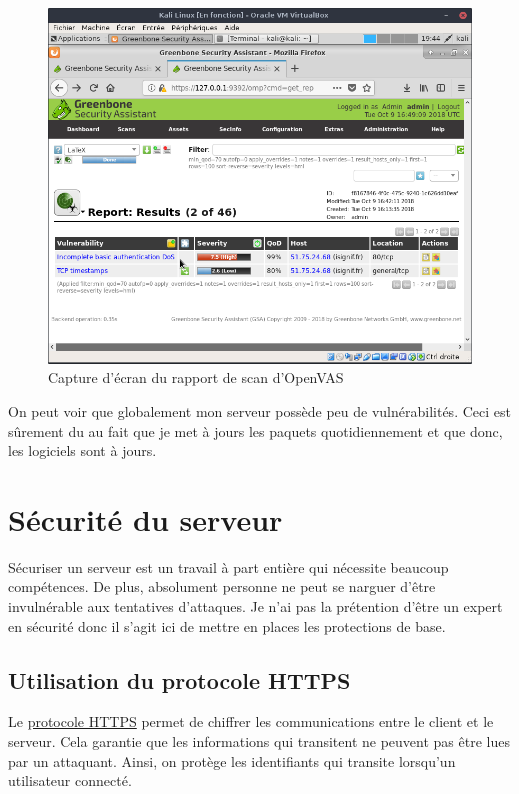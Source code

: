 \documentclass[]{report}
\begin{document}
      \begin{figure}
        \includegraphics[width=\linewidth]{img/kali_openvas_report.png}
        \caption{Capture d'écran du rapport de scan d'OpenVAS}
        \label{fig:openvas_report}
      \end{figure}

      On peut voir que globalement mon serveur possède peu de vulnérabilités. Ceci est sûrement du au fait que je met à jours les paquets quotidiennement et que donc, les logiciels sont à jours.


  \section{Sécurité du serveur}

    Sécuriser un serveur est un travail à part entière qui nécessite beaucoup compétences. De plus, absolument personne ne peut se narguer d'être invulnérable aux tentatives d'attaques. Je n'ai pas la prétention d'être un expert en sécurité donc il s'agit ici de mettre en places les protections de base.

    \subsection{Utilisation du protocole HTTPS}

      Le \href{https://fr.wikipedia.org/wiki/HyperText_Transfer_Protocol_Secure}{protocole HTTPS} permet de chiffrer les communications entre le client et le serveur. Cela garantie que les informations qui transitent ne peuvent pas être lues par un attaquant. Ainsi, on protège les identifiants qui transite lorsqu'un utilisateur connecté.
\end{document}
